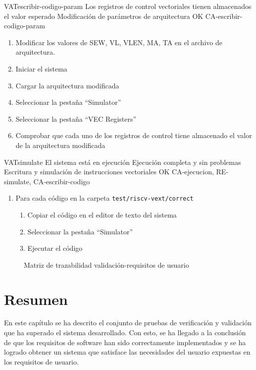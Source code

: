 \begin{testCase}{VAT}{escribir-codigo-param}
    {\NA}
    {Los registros de control vectoriales tienen almacenados el valor esperado}
    {Modificación de parámetros de arquitectura} %
    {OK} %
    {CA-escribir-codigo-param}
    \begin{enumerate}
        \item Modificar los valores de SEW, VL, VLEN, MA, TA en el archivo de arquitectura.
        \item Iniciar el sistema
        \item Cargar la arquitectura modificada
        \item Seleccionar la pestaña ``Simulator''
        \item Seleccionar la pestaña ``VEC Registers''
        \item Comprobar que cada uno de los registros de control tiene almacenado el valor de la arquitectura modificada
    \end{enumerate}
\end{testCase}

\begin{testCase}{VAT}{simulate}
    {El sistema está en ejecución}
    {Ejecución completa y sin problemas}
    {Escritura y simulación de instrucciones vectoriales}
    {OK} %
    {CA-ejecucion, RE-simulate, CA-escribir-codigo}
    
    \begin{enumerate}
        \item Para cada código en la carpeta \texttt{test/riscv-vext/correct}
            \begin{enumerate}
                \item Copiar el código en el editor de texto del sistema
                \item Seleccionar la pestaña ``Simulator''
                \item Ejecutar el código
            \end{enumerate}
    \end{enumerate}
\end{testCase}

\FloatBarrier

\begin{figure}
    {\traceabilityVATUR}
    \caption{Matriz de trazabilidad validación-requisitos de usuario}\label{fig:traz-matrix-vat}
\end{figure}

\FloatBarrier

\section{Resumen}

En este capítulo se ha descrito el conjunto de pruebas de verificación y validación que ha superado el sistema desarrollado. Con esto, se ha llegado a la conclusión de que los requisitos de software han sido correctamente implementados y se ha logrado obtener un sistema que satisface las necesidades del usuario expuestas en los requisitos de usuario.
